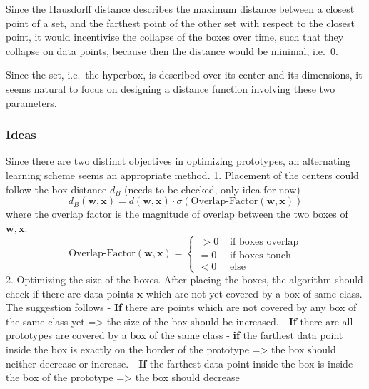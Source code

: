 \documentclass[
]{article}
\begin{document}
Since the Hausdorff distance describes the maximum distance between a
closest point of a set, and the farthest point of the other set with
respect to the closest point, it would incentivise the collapse of the
boxes over time, such that they collapse on data points, because then
the distance would be minimal, i.e.~0.

Since the set, i.e.~the hyperbox, is described over its center and its
dimensions, it seems natural to focus on designing a distance function
involving these two parameters.

\hypertarget{ideas}{%
\subsubsection{Ideas}\label{ideas}}

Since there are two distinct objectives in optimizing prototypes, an
alternating learning scheme seems an appropriate method. 1. Placement of
the centers could follow the box-distance \(d_B\) (needs to be checked,
only idea for now)
\[d_{B}(\mathbf{w},\mathbf{x})= d(\mathbf{w}, \mathbf{x}) \cdot \sigma(\text{Overlap-Factor}(\mathbf{w},\mathbf{x}))\]
where the overlap factor is the magnitude of overlap between the two
boxes of \(\mathbf{w}, \mathbf{x}\).
\[\text{Overlap-Factor}(\mathbf{w}, \mathbf{x})=\begin{cases}
  \>>0 & \text{ if boxes overlap}\\ 
  =0 & \text{ if boxes touch} \\
<0 & \text{ else }
\end{cases}\] 2. Optimizing the size of the boxes. After placing the
boxes, the algorithm should check if there are data points
\(\mathbf{x}\) which are not yet covered by a box of same class. The
suggestion follows - \textbf{If} there are points which are not covered
by any box of the same class yet =\textgreater{} the size of the box
should be increased. - \textbf{If} there are all prototypes are covered
by a box of the same class - \textbf{if} the farthest data point inside
the box is exactly on the border of the prototype =\textgreater{} the
box should neither decrease or increase. - \textbf{If} the farthest data
point inside the box is inside the box of the prototype =\textgreater{}
the box should decrease
\end{document}
